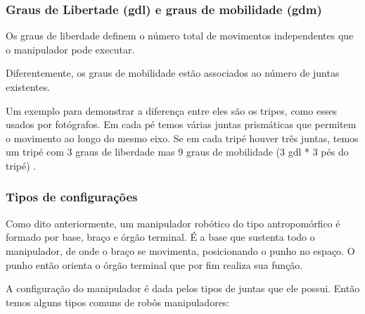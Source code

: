 \subsubsection{Graus de Libertade (gdl) e graus de mobilidade (gdm)}

Os graus de liberdade definem o número total de movimentos independentes que o manipulador pode executar.

Diferentemente, os graus de mobilidade estão associados ao número de juntas existentes.

Um exemplo para demonstrar a diferença entre eles são os tripes, como esses usados por fotógrafos.  Em cada pé temos várias juntas prismáticas que permitem o movimento ao longo do mesmo eixo. Se em cada tripé houver três juntas, temos um tripé com 3 graus de liberdade mas 9 graus de mobilidade (3 gdl * 3 pés do tripé) \cite{Santos2004}.

\subsubsection{Tipos de configurações}

Como dito anteriormente, um manipulador robótico do tipo antropomórfico é formado por base, braço e órgão terminal. É a base que sustenta todo o manipulador, de onde o braço se movimenta, posicionando o punho no espaço. O punho então orienta o órgão terminal que por fim realiza sua função.

A configuração do manipulador é dada pelos tipos de juntas que ele possui. Então temos alguns tipos comuns de robôs manipuladores:

